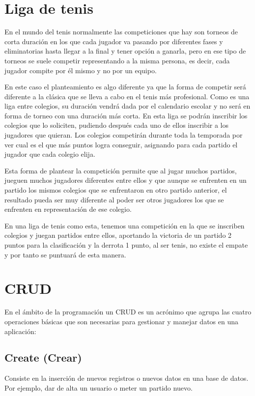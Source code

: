 

\section{Liga de tenis}
En el mundo del tenis normalmente las competiciones que hay son torneos de corta duración en los que cada jugador va pasando por diferentes fases y eliminatorias hasta llegar a la final y tener opción a ganarla, pero en ese tipo de torneos se suele competir representando a la misma persona, es decir, cada jugador compite por él mismo y no por un equipo.

En este caso el planteamiento es algo diferente ya que la forma de competir será diferente a la clásica que se lleva a cabo en el tenis más profesional. Como es una liga entre colegios, su duración vendrá dada por el calendario escolar y no será en forma de torneo con una duración más corta. En esta liga se podrán inscribir los colegios que lo soliciten, pudiendo después cada uno de ellos inscribir a los jugadores que quieran. Los colegios competirán durante toda la temporada por ver cual es el que más puntos logra conseguir, asignando para cada partido el jugador que cada colegio elija.

Esta forma de plantear la competición permite que al jugar muchos partidos, jueguen muchos jugadores diferentes entre ellos y que aunque se enfrenten en un partido los mismos colegios que se enfrentaron en otro partido anterior, el resultado pueda ser muy diferente al poder ser otros jugadores los que se enfrenten en representación de ese colegio.

En una liga de tenis como esta, tenemos una competición en la que se inscriben colegios y juegan partidos entre ellos, aportando la victoria de un partido 2 puntos para la clasificación y la derrota 1 punto, al ser tenis, no existe el empate y por tanto se puntuará de esta manera.

\section{CRUD}
En el ámbito de la programación un CRUD es un acrónimo que agrupa las cuatro operaciones básicas que son necesarias para gestionar y manejar datos en una aplicación:

\subsection{Create (Crear)}
Consiste en la inserción de nuevos registros o nuevos datos en una base de datos. Por ejemplo, dar de alta un usuario o meter un partido nuevo.

